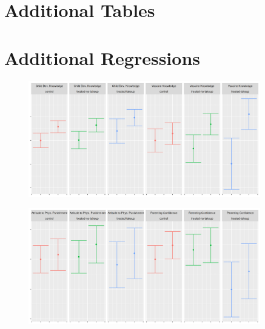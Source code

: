\documentclass{article}
\begin{document}
\section{Additional Tables}







\section{Additional Regressions}








\begin{figure}[H]
  \centering
\includegraphics[width=0.9\textwidth]{plots/pre_post/Serbia: Vaccine Knowledge.png}
\end{figure}



\begin{figure}[H]
  \centering
\includegraphics[width=0.9\textwidth]{plots/pre_post/Serbia: Parenting Confidence.png}
\end{figure}
\end{document}
